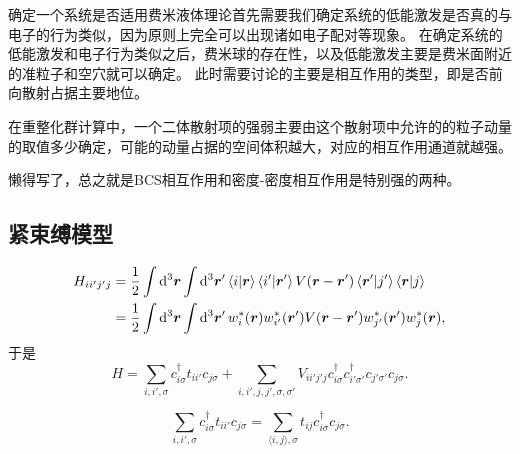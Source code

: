 \documentclass[hyperref, UTF8, a4paper]{ctexart}
\newcommand*{\pair}[1]{\langle #1 \rangle}
\begin{document}
确定一个系统是否适用费米液体理论首先需要我们确定系统的低能激发是否真的与电子的行为类似，因为原则上完全可以出现诸如电子配对等现象。
在确定系统的低能激发和电子行为类似之后，费米球的存在性，以及低能激发主要是费米面附近的准粒子和空穴就可以确定。
此时需要讨论的主要是相互作用的类型，即是否前向散射占据主要地位。

在重整化群计算中，一个二体散射项的强弱主要由这个散射项中允许的的粒子动量的取值多少确定，可能的动量占据的空间体积越大，对应的相互作用通道就越强。

懒得写了，总之就是BCS相互作用和密度-密度相互作用是特别强的两种。


\subsection{紧束缚模型}

\begin{equation}
    \begin{aligned}
        H_{i i' j' j} &= \frac{1}{2} \int \dd[3]{\vb*{r}} \int \dd[3]{\vb*{r}'} \braket{i}{\vb*{r}} \braket{i'}{\vb*{r}'} V(\vb*{r} - \vb*{r}') \braket{\vb*{r}'}{j'} \braket{\vb*{r}}{j} \\
        &= \frac{1}{2} \int \dd[3]{\vb*{r}} \int \dd[3]{\vb*{r}'} w_i^*(\vb*{r}) w_{i'}^*(\vb*{r}') V(\vb*{r} - \vb*{r}') w_{j'}^*(\vb*{r}') w_j^*(\vb*{r}),
    \end{aligned}
    \label{eq:wannier-basis-interaction}
\end{equation}
于是
\begin{equation}
    H = \sum_{i, i', \sigma} c^\dagger_{i \sigma} t_{i i'} c_{j \sigma} + \sum_{i, i', j, j', \sigma, \sigma'} V_{i i' j' j} c^\dagger_{i \sigma} c^\dagger_{i' \sigma'} c_{j' \sigma'} c_{j \sigma}.
\end{equation}

\[
    \sum_{i, i', \sigma} c^\dagger_{i \sigma} t_{i i'} c_{j \sigma} = \sum_{\pair{i, j}, \sigma} t_{ij} c^\dagger_{i \sigma} c_{j \sigma}.
\]
\end{document}
